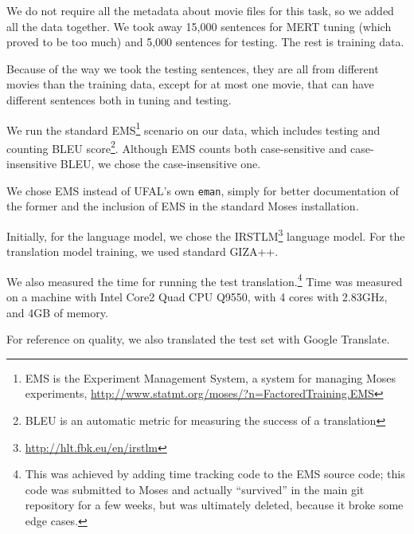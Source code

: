 We do not require all the metadata about movie files for this task, so we added all the data together. We took away 15,000 sentences for MERT tuning (which proved to be too much) and 5,000 sentences for testing. The rest is training data.

Because of the way we took the testing sentences, they are all from different movies than the training data, except for at most one movie, that can have different sentences both in tuning and testing.

We run the standard EMS\footnote{EMS is the Experiment Management System, a system for managing Moses experiments, \url{http://www.statmt.org/moses/?n=FactoredTraining.EMS}} scenario on our data, which includes testing and counting BLEU score\footnote{BLEU is an automatic metric for measuring the success of a translation}. Although EMS counts both case-sensitive and case-insensitive BLEU, we chose the case-insensitive one.

We chose EMS instead of UFAL's own \texttt{eman}, simply for better documentation of the former and the inclusion of EMS in the standard Moses installation.

Initially, for the language model, we chose the IRSTLM\footnote{\url{http://hlt.fbk.eu/en/irstlm}} language model. For the translation model training, we used standard GIZA++.

We also measured the time for running the test translation.\footnote{This was achieved by adding time tracking code to the EMS source code; this code was submitted to Moses and actually ``survived'' in the main git repository for a few weeks, but was ultimately deleted, because it broke some edge cases.} Time was measured on a machine with Intel Core2 Quad CPU Q9550, with 4 cores with 2.83GHz, and 4GB of memory.

For reference on quality, we also translated the test set with Google Translate.

